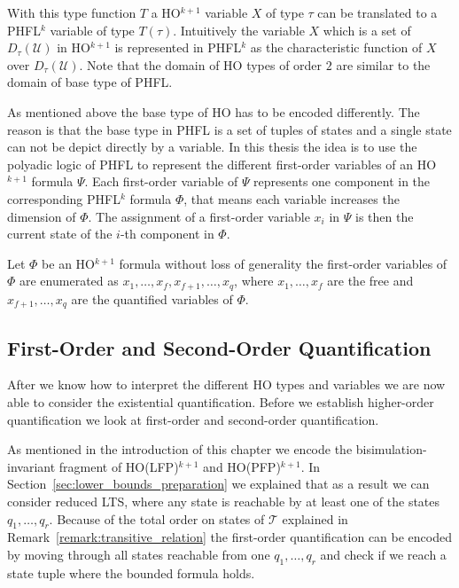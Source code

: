 With this type function $T$ a HO$^{k + 1}$ variable $X$ of type $\tau$ can be translated to a PHFL$^k$ variable
of type $T(\tau)$. Intuitively the variable $X$ which is a set of $D_\tau(\mathcal{U})$ in HO$^{k+1}$ is represented
in PHFL$^k$ as the characteristic function of $X$ over $D_\tau(\mathcal{U})$. Note that the domain of HO types
of order $2$ are similar to the domain of base type of PHFL.

As mentioned above the base type of HO has to be encoded differently. The reason is that the base type in PHFL is a
set of tuples of states and a single state can not be depict directly by a variable. In this thesis the
idea is to use the polyadic logic of PHFL to represent the different first-order variables of an HO$^{k+1}$ formula
$\Psi$. Each first-order variable of $\Psi$ represents one component in the corresponding PHFL$^k$ formula $\Phi$, that
means each variable increases the dimension of $\Phi$. The assignment of a first-order variable $x_i$ in $\Psi$ is
then the current state of the $i$-th component in $\Phi$.

Let $\Phi$ be an HO$^{k+1}$ formula without loss of generality the first-order variables of $\Phi$ are enumerated as
$x_1, \dots, x_f, x_{f + 1}, \dots, x_q$, where $x_1, \dots, x_f$ are the free and $x_{f+1}, \dots, x_q$ are the
quantified variables of $\Phi$.

\subsection{First-Order and Second-Order Quantification}\label{subsec:existentialQuantifiers}

After we know how to interpret the different HO types and variables we are now able to consider the existential
quantification. Before we establish higher-order quantification we look at first-order and second-order quantification.

As mentioned in the introduction of this chapter we encode the bisimulation-invariant fragment of HO(LFP)$^{k + 1}$ and HO(PFP)$^{k+1}$. In Section~\ref{sec:lower_bounds_preparation}  we explained that as a result we can consider reduced LTS, where any state is reachable by at least one of the states $q_1, \dots, q_r$. Because of the total order on states of $\mathcal{T}$ explained in Remark~\ref{remark:transitive_relation} the first-order
quantification can be encoded by moving through all states reachable from one $q_1, \dots, q_r$ and check if we
reach a state tuple where the bounded formula holds.

